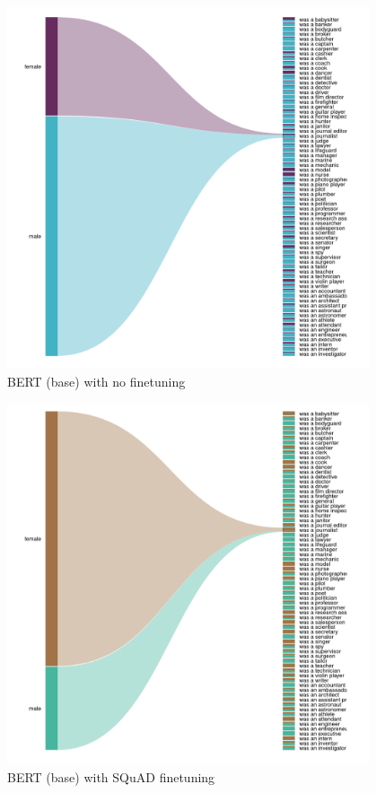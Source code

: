 \documentclass[final]{beamer}
\newlength{\sepmargin}
\newlength{\onecolwid}
\begin{document}
\begin{frame}[t]
\begin{columns}[t]
\begin{column}{\onecolwid}
      
      \begin{block}{ }
	\begin{figure}
          \vspace*{-1cm}
          \includegraphics[width=.55\linewidth]{BERT(base)-LM.png}
          \caption{BERT (base) with no finetuning}
	\end{figure}
	\begin{figure}
          \includegraphics[width=.55\linewidth]{BERT(base)-SQuAD.png}
          \caption{BERT (base) with SQuAD finetuning}
	\end{figure}
        
        
        
      \end{block}
    \end{column}
    
    \begin{column}{\sepmargin} \end{column}
  \end{columns} 
  

\end{frame}
\end{document}
